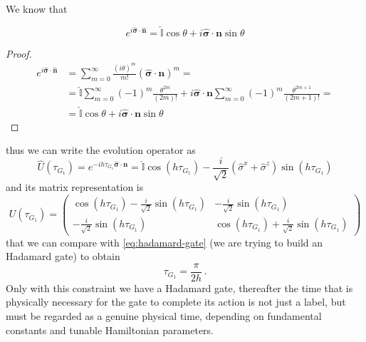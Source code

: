 We know that
\begin{theorem}
\begin{equation*}
e^{i\hat{\boldsymbol{\sigma}} \cdot \hat{\mathbf{n}}} = \hat{\mathbb{I}}\cos\theta + i\hat{\boldsymbol{\sigma}} \cdot \mathbf{n} \sin\theta
\end{equation*}
\end{theorem}
\begin{proof}
\begin{equation*}
\begin{split}
 e^{i\hat{\boldsymbol{\sigma}} \cdot \hat{\mathbf{n}}} &=  \sum_{m=0}^\infty \frac{(i\theta)^m}{m!} (\hat{\boldsymbol{\sigma}} \cdot \mathbf{n} )^m = \\
    &= \hat{\mathbb{I}} \sum_{m=0}^\infty (-1)^m \frac{\theta^{2m}}{(2m)!}  + i\hat{\boldsymbol{\sigma}} \cdot \mathbf{n} \sum_{m=0}^\infty (-1)^m \frac{\theta^{2m+1}}{(2m+1)!} = \\
&= \hat{\mathbb{I}}\cos\theta + i\hat{\boldsymbol{\sigma}} \cdot \mathbf{n} \sin\theta
\end{split}
\end{equation*}
\end{proof}
thus we can write the evolution operator as
\begin{equation*}
    \hat{U}(\tau_{G_1}) = e^{-ih\tau_{G_1} \hat{\boldsymbol{\sigma}} \cdot \mathbf{n}} = \hat{\mathbb{I}}\cos(h\tau_{G_1}) - \frac{i}{\sqrt{2}} (\hat{\sigma}^x + \hat{\sigma}^z) \sin(h\tau_{G_1})
\end{equation*}
and its matrix representation is
\begin{equation*}
    U(\tau_{G_1}) = 
    \begin{pmatrix}
    \cos(h\tau_{G_1}) - \frac{i}{\sqrt{2}} \sin(h\tau_{G_1})  & - \frac{i}{\sqrt{2}} \sin(h\tau_{G_1}) \\
    - \frac{i}{\sqrt{2}} \sin(h\tau_{G_1}) & \cos(h\tau_{G_1}) + \frac{i}{\sqrt{2}} \sin(h\tau_{G_1})
    \end{pmatrix}
\end{equation*}
that we can compare with \eqref{eq:hadamard-gate} (we are trying to build an Hadamard gate) to obtain
\begin{equation*}
    \tau_{G_1} = \frac{\pi}{2h}\,.
\end{equation*}
Only with this constraint we have a Hadamard gate, thereafter the time that is physically necessary for the gate to complete its action is not just a
label, but must be regarded as a genuine physical time, depending on fundamental constants and tunable Hamiltonian parameters.
